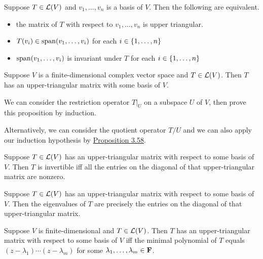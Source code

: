 \documentclass[12pt,a4paper]{article}
\begin{document}
    \begin{prop}
        Suppose $T\in\mathcal{L}(V)$ and $v_1,\dots,v_n$ is a basis of $V$. Then the following are equivalent.
        \begin{itemize}
            \item the matrix of $T$ with respect to $v_1,\dots,v_n$ is upper triangular.
            \item $T(v_i)\in\operatorname{span}(v_1,\dots,v_i)$ for each $i\in\left\{1,\dots,n\right\}$
            \item $\operatorname{span}(v_1,\dots,v_i)$ is invariant under $T$ for each $i\in\left\{1,\dots,n\right\}$
        \end{itemize}
    \end{prop}
    \hfill

    \begin{prop}\label{5.28}
        Suppose $V$ is a finite-dimensional complex vector space and $T\in\mathcal{L}(V)$. Then $T$ has an upper-triangular matrix with some basis of $V$.
    \end{prop}
    \begin{remark}
        We can consider the restriction operator $T|_{U}$ on a subspace $U$ of $V$, then prove this proposition by induction.
    \end{remark}
    \begin{remark}
        Alternatively, we can consider the quotient operator $T/U$ and we can also apply our induction hypothesis by \hyperref[3.58]{Proposition 3.58}.
    \end{remark}
    \hfill

    \begin{prop}
        Suppose $T\in\mathcal{L}(V)$ has an upper-triangular matrix with respect to some basis of $V$. Then $T$ is invertible iff all the entries on the diagonal of that upper-triangular matrix are nonzero.
    \end{prop}
    \begin{prop}
        Suppose $T\in\mathcal{L}(V)$ has an upper-triangular matrix with respect to some basis of $V$. Then the eigenvalues of $T$ are precisely the entries on the diagonal of that upper-triangular matrix.
    \end{prop}
    \hfill

    \begin{prop}
        Suppose $V$ is finite-dimensional and $T\in\mathcal{L}(V)$. Then $T$ has an upper-triangular matrix with respect to some basis of $V$ iff the minimal polynomial of $T$ equals $(z-\lambda_1)\cdots(z-\lambda_m)$ for some $\lambda_1,\dots,\lambda_m\in\mathbf{F}$.
    \end{prop}
    \hfill
\end{document}
